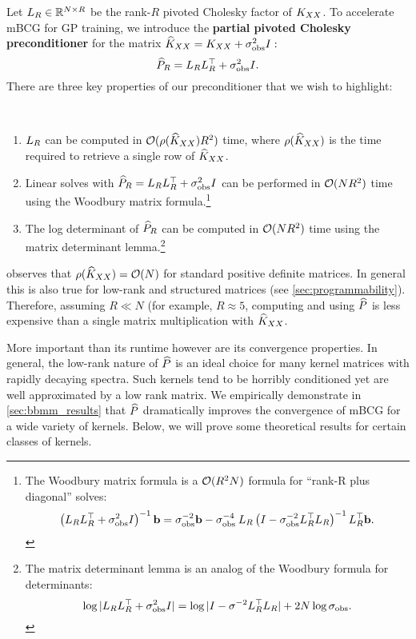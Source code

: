 Let $L_{R} \in \mathbb{R}^{N \times R}$ be the rank-$R$ pivoted Cholesky factor of $K_{XX}$.
To accelerate mBCG for GP training, we introduce the {\bf partial pivoted Cholesky preconditioner} for the matrix $\widehat{K}_{XX} = K_{XX} + \sigma^2_\text{obs} I:$
\begin{equation}
  \widehat{P}_R = L_{R} L_{R}^\top + \sigma^2_\text{obs} I.
\end{equation}
%
There are three key properties of our preconditioner that we wish to highlight:
%
\begin{observation}
  {\ }
  \begin{enumerate}
    \item $L_{R}$ can be computed in $\bigo{\row{\trainK}R^{2}}$ time, where $\rho ( \widehat{K}_{XX} )$ is the time required to retrieve a single row of $\widehat{K}_{XX}$.

    \item Linear solves with $\widehat{P}_R = L_{R} L_{R}^{\top} + \sigma_\text{obs}^{2} I$ can be performed in $\bigo{NR^{2}}$ time using the Woodbury matrix formula.\footnote{
      The Woodbury matrix formula is a $\bigo{R^2 N}$ formula for ``rank-R plus diagonal'' solves:
      $$\left( L_{R} L_{R}^{\top} + \sigma^{2}_\text{obs} I \right)^{-1} \mathbf{b} = {\sigma_\text{obs}^{-2}}\mathbf{b} - {\sigma_\text{obs}^{-4}} \: L_{R} \left( I - {\sigma^{-2}_\text{obs}} L_{R}^{\top} L_{R} \right)^{-1} L_{R}^{\top}\mathbf{b}.$$
    }

    \item The log determinant of $\widehat{P}_R$ can be computed in $\bigo{NR^{2}}$ time using the matrix determinant lemma.\footnote{
      The matrix determinant lemma is an analog of the Woodbury formula for determinants:
      $$\log \vert L_{R} L_{R}^\top + \sigma^{2}_\text{obs} I \vert = \log \vert I - {\sigma^{-2}} L_{R}^{\top} L_{R} \vert + 2 N \log \sigma_\text{obs}.$$
    }
  \end{enumerate}
\end{observation}
%
\noindent
\citet{harbrecht2012low} observes that $\row{\trainK} = \bigo{N}$ for standard positive definite matrices.
In general this is also true for low-rank and structured matrices (see \cref{sec:programmability}).
Therefore, assuming $R \ll N$ (for example, $R \approx 5$, computing and using $\widehat{P}$ is less expensive than a single matrix multiplication with $\widehat{K}_{XX}$.

More important than its runtime however are its convergence properties.
In general, the low-rank nature of $\widehat{P}$ is an ideal choice for many kernel matrices with rapidly decaying spectra.
Such kernels tend to be horribly conditioned yet are well approximated by a low rank matrix.
We empirically demonstrate in \cref{sec:bbmm_results} that $\widehat{P}$ dramatically improves the convergence of mBCG for a wide variety of kernels.
Below, we will prove some theoretical results for certain classes of kernels.

